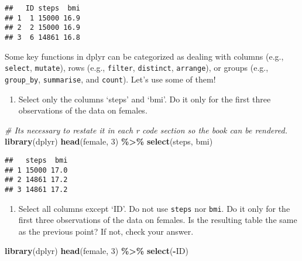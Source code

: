 \documentclass[
]{book}
\newenvironment{Shaded}{\begin{snugshade}}{\end{snugshade}}
\newcommand{\CommentTok}[1]{\textcolor[rgb]{0.56,0.35,0.01}{\textit{#1}}}
\newcommand{\DecValTok}[1]{\textcolor[rgb]{0.00,0.00,0.81}{#1}}
\newcommand{\FunctionTok}[1]{\textcolor[rgb]{0.13,0.29,0.53}{\textbf{#1}}}
\newcommand{\NormalTok}[1]{#1}
\newcommand{\SpecialCharTok}[1]{\textcolor[rgb]{0.81,0.36,0.00}{\textbf{#1}}}
\providecommand{\tightlist}{%
  \setlength{\itemsep}{0pt}\setlength{\parskip}{0pt}}
\begin{document}
\begin{verbatim}
##   ID steps  bmi
## 1  1 15000 16.9
## 2  2 15000 16.9
## 3  6 14861 16.8
\end{verbatim}

Some key functions in dplyr can be categorized as dealing with columns (e.g., \texttt{select}, \texttt{mutate}), rows (e.g., \texttt{filter}, \texttt{distinct}, \texttt{arrange}), or groups (e.g., \texttt{group\_by}, \texttt{summarise}, and \texttt{count}). Let's use some of them!

\begin{enumerate}
\def\labelenumi{\arabic{enumi}.}
\setcounter{enumi}{1}
\tightlist
\item
  Select only the columns `steps' and `bmi'. Do it only for the first three observations of the data on females.
\end{enumerate}

\begin{Shaded}
\begin{Highlighting}[]
\CommentTok{\# It\textquotesingle{}s necessary to restate it in each r code section so the book can be rendered.}
\FunctionTok{library}\NormalTok{(dplyr)}
\FunctionTok{head}\NormalTok{(female, }\DecValTok{3}\NormalTok{) }\SpecialCharTok{\%\textgreater{}\%}
  \FunctionTok{select}\NormalTok{(steps, bmi)}
\end{Highlighting}
\end{Shaded}

\begin{verbatim}
##   steps  bmi
## 1 15000 17.0
## 2 14861 17.2
## 3 14861 17.2
\end{verbatim}

\begin{enumerate}
\def\labelenumi{\arabic{enumi}.}
\setcounter{enumi}{2}
\tightlist
\item
  Select all columns except `ID'. Do not use \texttt{steps} nor \texttt{bmi}. Do it only for the first three observations of the data on females. Is the resulting table the same as the previous point? If not, check your answer.
\end{enumerate}

\begin{Shaded}
\begin{Highlighting}[]
\FunctionTok{library}\NormalTok{(dplyr)}
\FunctionTok{head}\NormalTok{(female, }\DecValTok{3}\NormalTok{) }\SpecialCharTok{\%\textgreater{}\%}
  \FunctionTok{select}\NormalTok{(}\SpecialCharTok{{-}}\NormalTok{ID)}
\end{Highlighting}
\end{Shaded}
\end{document}
